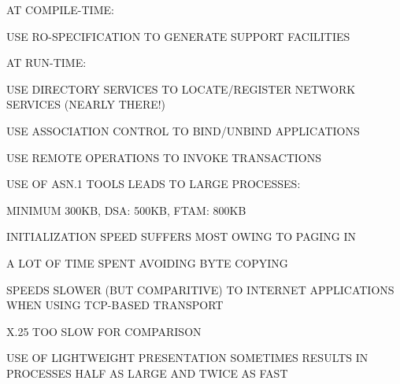 \begin{bwslide}

\begin{nrtc}
\item	AT COMPILE-TIME:
    \begin{nrtc}
    \item	USE RO-SPECIFICATION TO GENERATE SUPPORT FACILITIES
    \end{nrtc}

\item	AT RUN-TIME:
    \begin{nrtc}
    \item	USE DIRECTORY SERVICES TO LOCATE/REGISTER NETWORK SERVICES
		(NEARLY THERE!)

    \item	USE ASSOCIATION CONTROL TO BIND/UNBIND APPLICATIONS

    \item	USE REMOTE OPERATIONS TO INVOKE TRANSACTIONS
    \end{nrtc}
\end{nrtc}
\end{bwslide}






\begin{bwslide}

\begin{nrtc}
\item	USE OF ASN.1 TOOLS LEADS TO LARGE PROCESSES:
    \begin{nrtc}
    \item	MINIMUM 300KB, DSA: 500KB, FTAM: 800KB

    \item	INITIALIZATION SPEED SUFFERS MOST OWING TO PAGING IN
    \end{nrtc}

\item	A LOT OF TIME SPENT AVOIDING BYTE COPYING

\item	SPEEDS SLOWER (BUT COMPARITIVE) TO INTERNET APPLICATIONS WHEN USING
	TCP-BASED TRANSPORT

\item	X.25 TOO SLOW FOR COMPARISON

\item	USE OF LIGHTWEIGHT PRESENTATION SOMETIMES RESULTS IN PROCESSES HALF
	AS LARGE AND TWICE AS FAST
\end{nrtc}
\end{bwslide}


